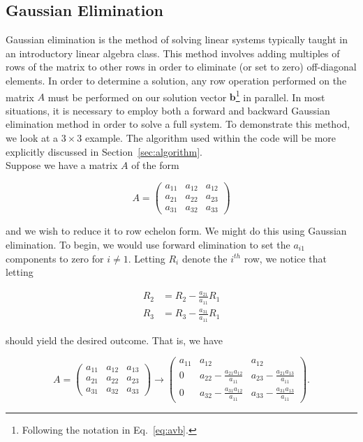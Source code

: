 \documentclass[12pt]{article}
\numberwithin{equation}{section}
\begin{document}
\subsection{Gaussian Elimination}
\label{subsec:gausselim}

Gaussian elimination is the method of solving linear systems typically taught in an introductory linear algebra class. This method involves adding multiples of rows of the matrix to other rows in order to eliminate (or set to zero) off-diagonal elements.  In order to determine a solution, any row operation performed on the matrix $A$ must be performed on our solution vector $\textbf{b}$\footnote{Following the notation in Eq.~\ref{eq:avb}.} in parallel.  In most situations, it is necessary to employ both a forward and backward Gaussian elimination method in order to solve a full system.  To demonstrate this method, we look at a $3\times 3$ example.  The algorithm used within the code will be more explicitly discussed in Section~\ref{sec:algorithm}.
\\\indent Suppose we have a matrix $A$ of the form

\begin{equation}
\label{eq:ainit}
A = \left(
\begin{array}{ccc}
a_{11} & a_{12} & a_{12} \\
a_{21} & a_{22} & a_{23} \\
a_{31} & a_{32} & a_{33}
\end{array}
\right)
\end{equation}

\noindent and we wish to reduce it to row echelon form.  We might do this using Gaussian elimination.  To begin, we would use forward elimination to set the $a_{i1}$ components to zero for $i\neq1$.  Letting $R_{i}$ denote the $i^{th}$ row, we notice that letting 

\begin{equation}
\label{eq:rowops1}
\begin{align}
R_{2} & = R_{2} - \frac{a_{21}}{a_{11}}R_{1} \\
R_{3} & = R_{3} - \frac{a_{31}}{a_{11}}R_{1}
\end{align}
\end{equation}

\noindent should yield the desired outcome.  That is, we have 

$$A = \left(
\begin{array}{ccc}
a_{11} & a_{12} & a_{13} \\
a_{21} & a_{22} & a_{23} \\
a_{31} & a_{32} & a_{33}
\end{array}
\right) \rightarrow \left(
\begin{array}{ccc}
a_{11} & a_{12} & a_{12} \\
0 & a_{22} - \frac{a_{21}a_{12}}{a_{11}} & a_{23} - \frac{a_{21}a_{13}}{a_{11}} \\
0 & a_{32} - \frac{a_{31}a_{12}}{a_{11}} & a_{33} - \frac{a_{31}a_{13}}{a_{11}}
\end{array}\right).$$
\end{document}
